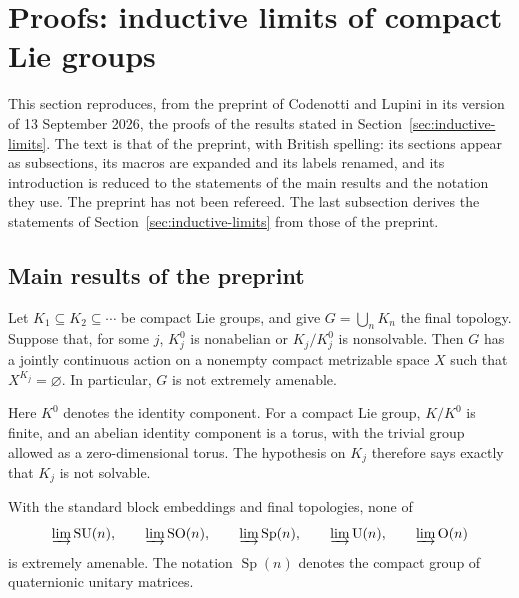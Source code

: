 \section{Proofs: inductive limits of compact Lie groups}\label{sec:proofs-inductive-limits}

This section reproduces, from the preprint of Codenotti and Lupini
\cite{LupiniInductive2026} in its version of 13 September 2026, the proofs of
the results stated in Section~\ref{sec:inductive-limits}. The text is that of
the preprint, with British spelling: its sections appear as subsections, its
macros are expanded and its labels renamed, and its introduction is reduced to
the statements of the main results and the notation they use. The preprint has
not been refereed. The last subsection derives the statements of
Section~\ref{sec:inductive-limits} from those of the preprint.

\subsection{Main results of the preprint}\label{sec:ind-main-results}

\begin{theorem}\label{thm:ind-main}
Let $K_1\subseteq K_2\subseteq\cdots$ be compact Lie groups, and give
$G=\bigcup_nK_n$ the final topology. Suppose that, for some $j$,
$K_j^0$ is nonabelian or $K_j/K_j^0$ is nonsolvable. Then $G$ has a
jointly continuous action on a nonempty compact metrizable space $X$
such that $X^{K_j}=\varnothing$. In particular, $G$ is not extremely
amenable.
\end{theorem}

Here $K^0$ denotes the identity component. For a compact Lie group,
$K/K^0$ is finite, and an abelian identity component is a torus, with
the trivial group allowed as a zero-dimensional torus. The hypothesis on
$K_j$ therefore says exactly that $K_j$ is not solvable.

\begin{corollary}\label{cor:ind-classical-intro}
With the standard block embeddings and final topologies, none of
\[
\varinjlim\operatorname{SU}(n),\qquad \varinjlim\operatorname{SO}(n),\qquad
\varinjlim\operatorname{Sp}(n),\qquad \varinjlim\operatorname{U}(n),\qquad
\varinjlim\operatorname{O}(n)
\]
is extremely amenable. The notation $\operatorname{Sp}(n)$ denotes the compact group
of quaternionic unitary matrices.
\end{corollary}


